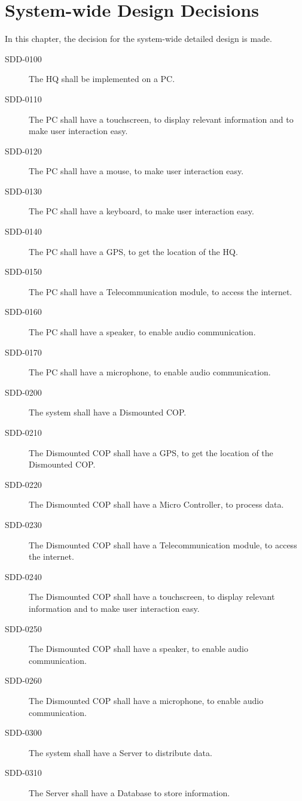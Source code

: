 \chapter{System-wide Design Decisions}

In this chapter, the decision for the system-wide detailed design is made.

\begin{description}
\item[SDD-0100] The HQ shall be implemented on a PC.
\item[SDD-0110] The PC shall have a touchscreen, to display relevant information and to make user interaction easy.
\item[SDD-0120] The PC shall have a mouse, to make user interaction easy.
\item[SDD-0130] The PC shall have a keyboard, to make user interaction easy.
\item[SDD-0140] The PC shall have a GPS, to get the location of the HQ.
\item[SDD-0150] The PC shall have a Telecommunication module, to access the internet.
\item[SDD-0160] The PC shall have a speaker, to enable audio communication.
\item[SDD-0170] The PC shall have a microphone, to enable audio communication.
\item[SDD-0200] The system shall have a Dismounted COP.
\item[SDD-0210] The Dismounted COP shall have a GPS, to get the location of the Dismounted COP.
\item[SDD-0220] The Dismounted COP shall have a Micro Controller, to process data.
\item[SDD-0230] The Dismounted COP shall have a Telecommunication module, to access the internet.
\item[SDD-0240] The Dismounted COP shall have a touchscreen, to display relevant information and to make user interaction easy.
\item[SDD-0250] The Dismounted COP shall have a speaker, to enable audio communication.
\item[SDD-0260] The Dismounted COP shall have a microphone, to enable audio communication.
\item[SDD-0300] The system shall have a Server to distribute data.
\item[SDD-0310] The Server shall have a Database to store information.
\end{description}